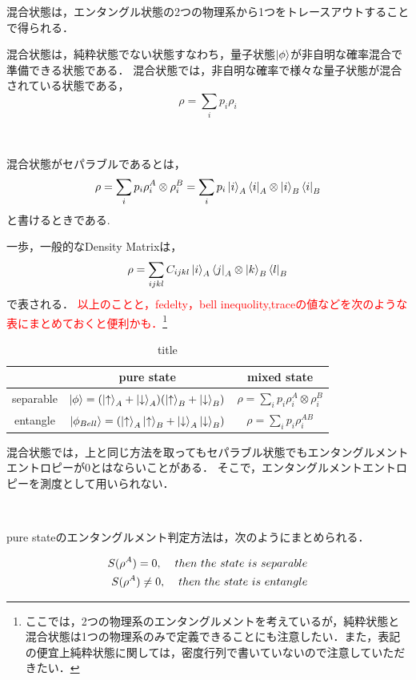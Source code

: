 混合状態は，エンタングル状態の2つの物理系から1つをトレースアウトすることで得られる．



混合状態は，純粋状態でない状態すなわち，量子状態$\ket{\phi}$が非自明な確率混合で準備できる状態である．
混合状態では，非自明な確率で様々な量子状態が混合されている状態である，
\begin{equation}
\rho=\sum_{i}p_i\rho_{i}
\end{equation}
\begin{empheqboxed}
  \
  \

  混合状態がセパラブルであるとは，
  \begin{equation}
  \label{30}
  \rho=\sum_{i}p_i\rho^{A}_{i}\otimes\rho^{B}_{i}=\sum_{i}p_i\ket{i}_A\bra{i}_{A}\otimes\ket{i}_B\bra{i}_{B}
  \end{equation}
  と書けるときである.
\end{empheqboxed}
一歩，一般的なDensity Matrixは，
\begin{eqnarray}
\label{40}
\rho=\sum_{ijkl}C_{ijkl}\ket{i}_A\bra{j}_{A}\otimes\ket{k}_B\bra{l}_{B}
\end{eqnarray}
で表される．
\textcolor{red}{以上のことと，fedelty，bell inequolity,traceの値などを次のような表にまとめておくと便利かも．}\footnote{ここでは，2つの物理系のエンタングルメントを考えているが，純粋状態と混合状態は1つの物理系のみで定義できることにも注意したい．また，表記の便宜上純粋状態に関しては，密度行列で書いていないので注意していただきたい．}
{\renewcommand{\arraystretch}{2}
\begin{table}[H]
  \begin{center}
    \begin{tabular}{c|c|c}
       & pure state & mixed state  \\\hline
      separable & $ \ket{\phi}=(\ket{\uparrow}_{A}+\ket{\downarrow}_{A})(\ket{\uparrow}_{B} +\ket{\downarrow}_{B})$ & $\rho=\sum_{i}p_i\rho^{A}_{i}\otimes\rho^{B}_{i}$ \\\hline
      entangle &    $\ket{\phi_{Bell}}=(\ket{\uparrow}_{A}\ket{\uparrow}_{B}+\ket{\downarrow}_{A}\ket{\downarrow}_{B})$  & $\rho=\sum_{i}p_i\rho^{AB}_{i}$
    \end{tabular}
  \end{center}
  \caption{title}
\end{table}}

混合状態では，上と同じ方法を取ってもセパラブル状態でもエンタングルメントエントロピーが$0$とはならいことがある．
そこで，エンタングルメントエントロピーを測度として用いられない．
\begin{empheqboxed}
  \
  \

  pure stateのエンタングルメント判定方法は，次のようにまとめられる．

  \begin{align}
    S(\rho^{A})=0, \hspace{4mm} then\ the\ state\ is\ separable\\
    S(\rho^{A})\neq0, \hspace{4mm} then\ the\ state\ is\ entangle
  \end{align}
\end{empheqboxed}

